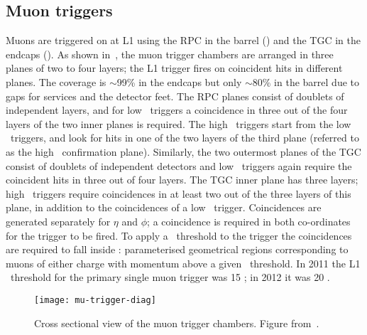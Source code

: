 \subsection{Muon triggers}
\label{sec:reco-mu-triggers}

Muons are triggered on at L1 using the RPC in the barrel () and
the TGC in the endcaps (). As shown in~, the
muon trigger chambers are arranged in three planes of two to four layers; the L1
trigger fires on coincident hits in different planes. The coverage is $\sim$99\% in the
endcaps but only $\sim$80\% in the barrel due to gaps for services and the
detector feet.  The RPC planes consist of doublets of independent layers, and
for low \pt\ triggers a coincidence in three out of the four layers of the two inner planes
is required. The high \pt\ triggers start from the low \pt\ triggers, and look
for hits in one of the two layers of the third plane (referred to as the high
\pt\ confirmation plane). Similarly, the two outermost planes of the TGC consist
of doublets of independent detectors and low \pt\ triggers again require the
coincident hits in three out of four layers. The TGC inner plane has three
layers; high \pt\ triggers require coincidences in at least two out of the three layers
of this plane, in addition to the coincidences of a low \pt\ trigger. Coincidences are generated
separately for $\eta$ and $\phi$; a coincidence is required in both co-ordinates
for the trigger to be fired. To apply a \pt\ threshold to the trigger the
coincidences are required to fall inside : parameterised
geometrical regions corresponding to muons of either charge with momentum above
a given \pt\ threshold. In 2011 the L1 \pt\ threshold for the primary single
muon trigger was 15 \GeV; in 2012 it was 20 \GeV.

\begin{figure}[h]
\centering
            \texttt{[image: mu-trigger-diag]}
    \caption[Cross sectional view of the muon trigger chambers.]
    {Cross sectional view of the
    muon trigger chambers. Figure from~\cite{Aad:2012xs}.}
    \label{fig:mu-trigger-diag}
\end{figure}


